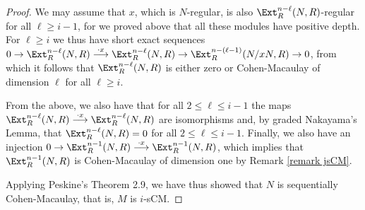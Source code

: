 \documentclass[12pt]{amsart}
\newcommand{\ooo}[1]{{\color{red} \sf $\clubsuit\clubsuit\clubsuit$ [#1]}}
\theoremstyle{definition}
\theoremstyle{definition}
\renewcommand{\leq}{\leqslant}
\renewcommand{\geq}{\geqslant}
\let\lra\longrightarrow
\begin{document}
\begin{proof}
We may assume that $x$, which  is $N$-regular, is also    $\Ext^{n-\ell}_R(N,R)$-regular for all $\ell \geq i-1$, for we proved above that all these modules  have positive depth.  For $\ell \geq i$ we thus  have short exact sequences $0 \to \Ext^{n-\ell}_R(N,R) \stackrel{\cdot x}{\lra} \Ext^{n-\ell}_R(N,R) \to \Ext^{n-(\ell-1)}_R(N/xN,R) \to 0$, from which  it follows that $\Ext^{n-\ell}_R(N,R)$ is either zero or Cohen-Macaulay of dimension $\ell$ for all $\ell \geq i$.

\noindent
From the above, we also have that for all $2 \leq \ell \leq i-1$ 
the maps $\Ext^{n-\ell}_R(N,R) \stackrel{\cdot x}{\longrightarrow} \Ext^{n-\ell}_R(N,R)$ are isomorphisms  and,  by graded Nakayama's Lemma, that $\Ext^{n-\ell}_R(N,R)=0$ for all $2 \leq \ell \leq i-1$. Finally, we also have an injection $0 \to \Ext^{n-1}_R(N,R) \stackrel{\cdot x}{\longrightarrow} \Ext^{n-1}_R(N,R)$, which implies that $\Ext^{n-1}_R(N,R)$ is Cohen-Macaulay of dimension one by Remark \ref{remark jsCM}.

Applying Peskine's Theorem 2.9, we have thus showed that $N$ is sequentially Cohen-Macaulay, that is, $M$ is $i$-sCM. 
 

\end{proof}
\end{document}
